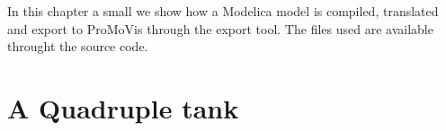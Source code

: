 In this chapter a small we show how a Modelica model is compiled, translated and export to ProMoVis through the export tool. The files used are available throught the source code\cite{githabb}\nocite{*}.

\section{A Quadruple tank}

